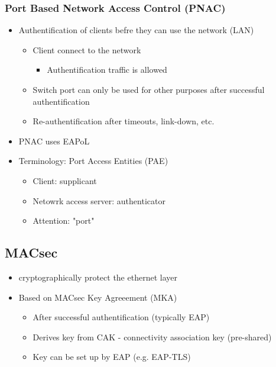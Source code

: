 \subsubsection{Port Based Network Access Control (PNAC)}
\begin{itemize}
  \item Authentification of clients befre they can use the network (LAN)
    \begin{itemize}
      \item Client connect to the network
        \begin{itemize}
          \item Authentification traffic is allowed
        \end{itemize}
      \item Switch port can only be used for other purposes after successful authentification
      \item Re-authentification after timeouts, link-down, etc.
    \end{itemize}
  \item PNAC uses EAPoL
  \item Terminology: Port Access Entities (PAE)
    \begin{itemize}
      \item Client: supplicant
      \item Netowrk access server: authenticator
      \item Attention: "port"
    \end{itemize}
\end{itemize}

\subsection{MACsec}
\begin{itemize}
  \item cryptographically protect the ethernet layer
  \item Based on MACsec Key Agreeement (MKA)
    \begin{itemize}
      \item After successful authentification (typically EAP)
      \item Derives key from CAK - connectivity association key (pre-shared)
      \item Key can be set up by EAP (e.g. EAP-TLS)
    \end{itemize}
\end{itemize}
